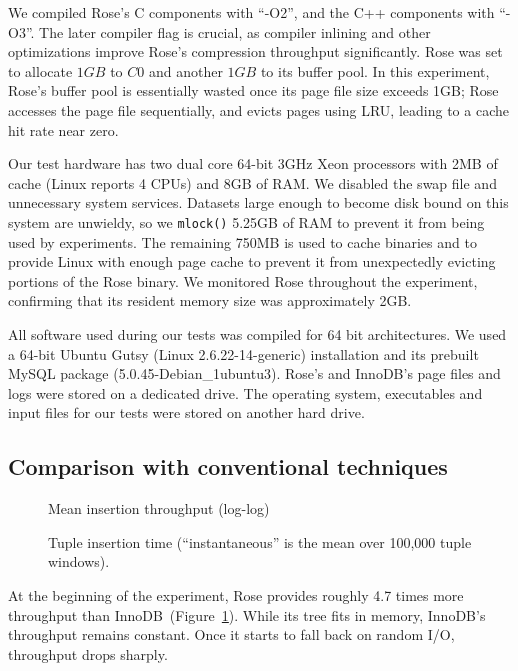 \documentclass{vldb}
\newcommand{\rows}{Rose\xspace}
\newcommand{\rowss}{Rose's\xspace}
\begin{document}
We compiled \rowss C components with ``-O2'', and the C++ components
with ``-O3''.  The later compiler flag is crucial, as compiler
inlining and other optimizations improve \rowss compression throughput
significantly.  \rows was set to allocate $1GB$ to $C0$ and another
$1GB$ to its buffer pool.  In this experiment, \rowss buffer pool is
essentially wasted once its page file size exceeds 1GB; \rows
accesses the page file sequentially, and evicts pages using LRU,
leading to a cache hit rate near zero.

Our test hardware has two dual core 64-bit 3GHz Xeon processors with
2MB of cache (Linux reports 4 CPUs) and 8GB of RAM.  We disabled the
swap file and unnecessary system services.  Datasets large enough to
become disk bound on this system are unwieldy, so we {\tt mlock()} 5.25GB of
RAM to prevent it from being used by experiments.
The remaining 750MB is used to cache
binaries and to provide Linux with enough page cache to prevent it
from unexpectedly evicting portions of the \rows binary.  We monitored
\rows throughout the experiment, confirming that its resident memory
size was approximately 2GB.

All software used during our tests was compiled for 64 bit
architectures.  We used a 64-bit Ubuntu Gutsy (Linux
2.6.22-14-generic) installation and its prebuilt MySQL package
(5.0.45-Debian\_1ubuntu3).  \rowss and InnoDB's page files and logs
were stored on a dedicated drive.  The operating system, executables
and input files for our tests were stored on another hard drive.

\subsection{Comparison with conventional techniques}

\begin{figure}
\centering {}
\caption{Mean insertion throughput (log-log)}
\label{fig:avg-thru}
\end{figure}
\begin{figure}
\centering
{}
\caption{Tuple insertion time (``instantaneous'' is the mean over 100,000
  tuple windows).}
\label{fig:avg-tup}
\end{figure}

At the beginning of the experiment, \rows provides roughly 4.7 times more
throughput than InnoDB~(Figure~\ref{fig:avg-thru}).  While its tree fits
in memory, InnoDB's throughput remains constant.  Once it starts to fall back on random
I/O, throughput drops sharply.
\end{document}

